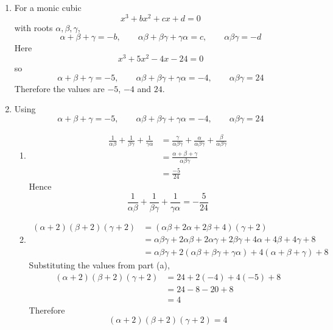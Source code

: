 \documentclass[leqno]{article}
\begin{document}
\begin{enumerate}[
  label=\textbf{\arabic*.},
  leftmargin=*,
  topsep=0pt,
  partopsep=0pt,
  parsep=0pt
]
\vspace*{10pt}

\begin{tcolorbox}[colback=white, colframe=scarlet, title={\textbf{Solution}}, breakable, grow to left by=6mm, grow to right by=10mm]
\begin{enumerate}[label=\textbf{(\alph*)}]
  \item For a monic cubic
  \[
  x^3+bx^2+cx+d=0
  \]
  with roots $\alpha,\beta,\gamma$,
  \[
  \alpha+\beta+\gamma=-b,\qquad \alpha\beta+\beta\gamma+\gamma\alpha=c,\qquad \alpha\beta\gamma=-d
  \]
  Here
  \[
  x^3+5x^2-4x-24=0
  \]
  so
  \[
  \alpha+\beta+\gamma=-5,\qquad \alpha\beta+\beta\gamma+\gamma\alpha=-4,\qquad \alpha\beta\gamma=24
  \]
  Therefore the values are $-5$, $-4$ and $24$.

  \item Using
  \[
  \alpha+\beta+\gamma=-5,\qquad \alpha\beta+\beta\gamma+\gamma\alpha=-4,\qquad \alpha\beta\gamma=24
  \]

  \begin{enumerate}[label=(\roman*)]
    \item
    \begin{align*}
    \frac{1}{\alpha\beta}+\frac{1}{\beta\gamma}+\frac{1}{\gamma\alpha}
    &=\frac{\gamma}{\alpha\beta\gamma}+\frac{\alpha}{\alpha\beta\gamma}+\frac{\beta}{\alpha\beta\gamma} \\
    &=\frac{\alpha+\beta+\gamma}{\alpha\beta\gamma} \\
    &=\frac{-5}{24}
    \end{align*}
    Hence
    \[
    \frac{1}{\alpha\beta}+\frac{1}{\beta\gamma}+\frac{1}{\gamma\alpha}=-\frac{5}{24}
    \]

    \item
    \begin{align*}
    (\alpha+2)(\beta+2)(\gamma+2)
    &=(\alpha\beta+2\alpha+2\beta+4)(\gamma+2) \\
    &=\alpha\beta\gamma+2\alpha\beta+2\alpha\gamma+2\beta\gamma+4\alpha+4\beta+4\gamma+8 \\
    &=\alpha\beta\gamma+2(\alpha\beta+\beta\gamma+\gamma\alpha)+4(\alpha+\beta+\gamma)+8
    \end{align*}
    Substituting the values from part (a),
    \begin{align*}
    (\alpha+2)(\beta+2)(\gamma+2)
    &=24+2(-4)+4(-5)+8 \\
    &=24-8-20+8 \\
    &=4
    \end{align*}
    Therefore
    \[
    (\alpha+2)(\beta+2)(\gamma+2)=4
    \]


\end{enumerate}
\end{enumerate}
\end{tcolorbox}
\end{enumerate}
\end{document}
